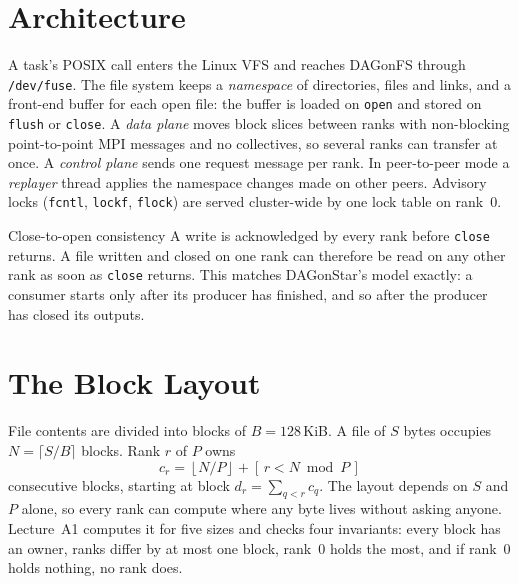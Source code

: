 \section{Architecture}

A task's POSIX call enters the Linux VFS and reaches DAGonFS through
\texttt{/dev/fuse}. The file system keeps a \emph{namespace} of directories,
files and links, and a front-end buffer for each open file: the buffer is
loaded on \texttt{open} and stored on \texttt{flush} or \texttt{close}. A
\emph{data plane} moves block slices between ranks with non-blocking
point-to-point MPI messages and no collectives, so several ranks can transfer
at once. A \emph{control plane} sends one request message per rank. In
peer-to-peer mode a \emph{replayer} thread applies the namespace changes
made on other peers. Advisory locks (\texttt{fcntl}, \texttt{lockf},
\texttt{flock}) are served cluster-wide by one lock table on rank~0.

\begin{definitionbox}{Close-to-open consistency}
A write is acknowledged by every rank before \texttt{close} returns. A file
written and closed on one rank can therefore be read on any other rank as
soon as \texttt{close} returns. This matches DAGonStar's model exactly: a
consumer starts only after its producer has finished, and so after the
producer has closed its outputs.
\end{definitionbox}

\section{The Block Layout}

File contents are divided into blocks of $B = 128$\,KiB. A file of $S$ bytes
occupies $N = \lceil S/B \rceil$ blocks. Rank $r$ of $P$ owns
\[
c_r = \left\lfloor N/P \right\rfloor + [\,r < N \bmod P\,]
\]
consecutive blocks, starting at block $d_r = \sum_{q<r} c_q$. The layout
depends on $S$ and $P$ alone, so every rank can compute where any byte lives
without asking anyone. Lecture~A1 computes it for five sizes and checks four
invariants: every block has an owner, ranks differ by at most one block, rank~0
holds the most, and if rank~0 holds nothing, no rank does.





